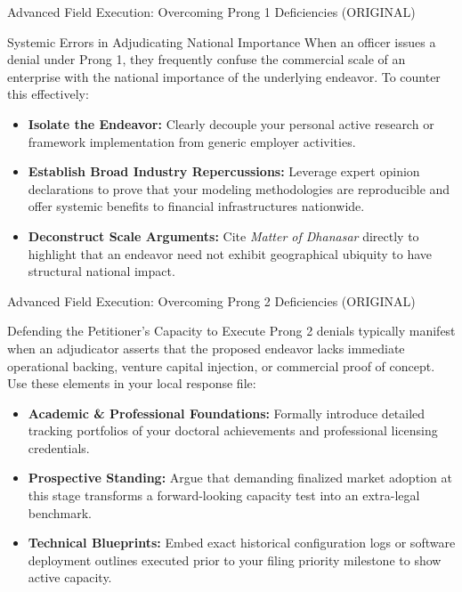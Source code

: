 \documentclass[11pt]{beamer}
\begin{document}
	
	\begin{frame}{Advanced Field Execution: Overcoming Prong 1 Deficiencies (ORIGINAL)}
		\scriptsize
		\begin{block}{Systemic Errors in Adjudicating National Importance}
			When an officer issues a denial under Prong 1, they frequently confuse the commercial scale of an enterprise with the national importance of the underlying endeavor. To counter this effectively:
			\begin{itemize}
				\item \textbf{Isolate the Endeavor:} Clearly decouple your personal active research or framework implementation from generic employer activities.
				\item \textbf{Establish Broad Industry Repercussions:} Leverage expert opinion declarations to prove that your modeling methodologies are reproducible and offer systemic benefits to financial infrastructures nationwide.
				\item \textbf{Deconstruct Scale Arguments:} Cite \textit{Matter of Dhanasar} directly to highlight that an endeavor need not exhibit geographical ubiquity to have structural national impact.
			\end{itemize}
		\end{block}
	\end{frame}
	
	\begin{frame}{Advanced Field Execution: Overcoming Prong 2 Deficiencies (ORIGINAL)}
		\scriptsize
		\begin{block}{Defending the Petitioner's Capacity to Execute}
			Prong 2 denials typically manifest when an adjudicator asserts that the proposed endeavor lacks immediate operational backing, venture capital injection, or commercial proof of concept. Use these elements in your local response file:
			\begin{itemize}
				\item \textbf{Academic \& Professional Foundations:} Formally introduce detailed tracking portfolios of your doctoral achievements and professional licensing credentials.
				\item \textbf{Prospective Standing:} Argue that demanding finalized market adoption at this stage transforms a forward-looking capacity test into an extra-legal benchmark.
				\item \textbf{Technical Blueprints:} Embed exact historical configuration logs or software deployment outlines executed prior to your filing priority milestone to show active capacity.
			\end{itemize}
		\end{block}
	\end{frame}
	
\end{document}
